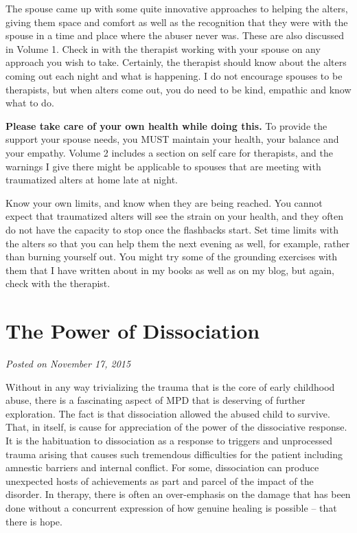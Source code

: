 \documentclass[]{book}
\begin{document}
The spouse came up with some quite innovative approaches to helping the alters, giving them space and comfort as well as the recognition that they were with the spouse in a time and place where the abuser never was. These are also discussed in Volume 1. Check in with the therapist working with your spouse on any approach you wish to take. Certainly, the therapist should know about the alters coming out each night and what is happening. I do not encourage spouses to be therapists, but when alters come out, you do need to be kind, empathic and know what to do.

\textbf{Please take care of your own health while doing this.} To provide the support your spouse needs, you MUST maintain your health, your balance and your empathy. Volume 2 includes a section on self care for therapists, and the warnings I give there might be applicable to spouses that are meeting with traumatized alters at home late at night.

Know your own limits, and know when they are being reached. You cannot expect that traumatized alters will see the strain on your health, and they often do not have the capacity to stop once the flashbacks start. Set time limits with the alters so that you can help them the next evening as well, for example, rather than burning yourself out. You might try some of the grounding exercises with them that I have written about in my books as well as on my blog, but again, check with the therapist.

\hypertarget{the-power-of-dissociation}{%
\section{The Power of Dissociation}\label{the-power-of-dissociation}}

\emph{Posted on November 17, 2015}

Without in any way trivializing the trauma that is the core of early childhood abuse, there is a fascinating aspect of MPD that is deserving of further exploration. The fact is that dissociation allowed the abused child to survive. That, in itself, is cause for appreciation of the power of the dissociative response. It is the habituation to dissociation as a response to triggers and unprocessed trauma arising that causes such tremendous difficulties for the patient including amnestic barriers and internal conflict. For some, dissociation can produce unexpected hosts of achievements as part and parcel of the impact of the disorder. In therapy, there is often an over-emphasis on the damage that has been done without a concurrent expression of how genuine healing is possible -- that there is hope.
\end{document}
